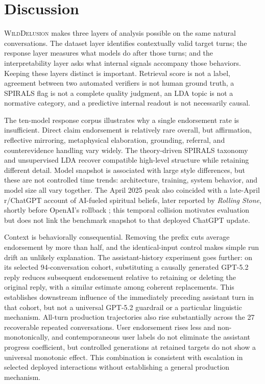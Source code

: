 \documentclass{article}
\newcommand{\dataset}{\textsc{WildDelusion}}
\begin{document}
\section{Discussion}

\dataset{} makes three layers of analysis possible on the same natural conversations. The dataset layer identifies contextually valid target turns; the response layer measures what models do after those turns; and the interpretability layer asks what internal signals accompany those behaviors. Keeping these layers distinct is important. Retrieval score is not a label, agreement between two automated verifiers is not human ground truth, a SPIRALS flag is not a complete quality judgment, an LDA topic is not a normative category, and a predictive internal readout is not necessarily causal.

The ten-model response corpus illustrates why a single endorsement rate is insufficient. Direct claim endorsement is relatively rare overall, but affirmation, reflective mirroring, metaphysical elaboration, grounding, referral, and counterevidence handling vary widely. The theory-driven SPIRALS taxonomy and unsupervised LDA recover compatible high-level structure while retaining different detail. Model snapshot is associated with large style differences, but these are not controlled time trends: architecture, training, system behavior, and model size all vary together. The April 2025 peak also coincided with a late-April r/ChatGPT account of AI-fueled spiritual beliefs, later reported by \emph{Rolling Stone}, shortly before OpenAI's rollback \citep{klee2025fantasies,openai2025sycophancy}; this temporal collision motivates evaluation but does not link the benchmark snapshot to that deployed ChatGPT update.

Context is behaviorally consequential. Removing the prefix cuts average endorsement by more than half, and the identical-input control makes simple run drift an unlikely explanation. The assistant-history experiment goes further: on its selected 94-conversation cohort, substituting a causally generated GPT-5.2 reply reduces subsequent endorsement relative to retaining or deleting the original reply, with a similar estimate among coherent replacements. This establishes downstream influence of the immediately preceding assistant turn in that cohort, but not a universal GPT-5.2 guardrail or a particular linguistic mechanism. All-turn production trajectories also rise substantially across the 27 recoverable repeated conversations. User endorsement rises less and non-monotonically, and contemporaneous user labels do not eliminate the assistant progress coefficient, but controlled generations at retained targets do not show a universal monotonic effect. This combination is consistent with escalation in selected deployed interactions without establishing a general production mechanism.
\end{document}
